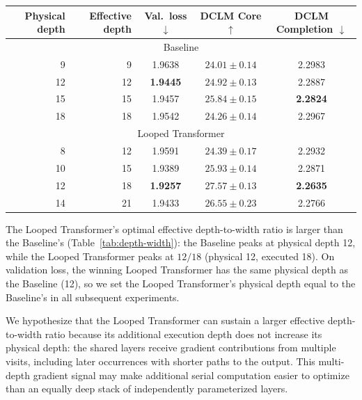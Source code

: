 \documentclass[]{bytedance_seed}
\theoremstyle{definition}
\theoremstyle{remark}
\begin{document}
\begin{center}
\small
{}
\label{tab:depth-width}
\begin{tabular}{rrccc}
\toprule
Physical depth & Effective depth &
Val.\ loss $\downarrow$ & DCLM Core $\uparrow$ & DCLM Completion $\downarrow$ \\
\midrule
\multicolumn{5}{c}{Baseline} \\
9  & 9  & 1.9638 & $24.01 \pm 0.14$ & 2.2983 \\
12 & 12 & \textbf{1.9445} & $24.92 \pm 0.13$ & 2.2887 \\
15 & 15 & 1.9457 & $\mathbf{25.84 \pm 0.15}$ & \textbf{2.2824} \\
18 & 18 & 1.9542 & $24.26 \pm 0.14$ & 2.2967 \\
\midrule
\multicolumn{5}{c}{Looped Transformer} \\
8  & 12 & 1.9591 & $24.39 \pm 0.17$ & 2.2932 \\
10 & 15 & 1.9389 & $25.93 \pm 0.14$ & 2.2871 \\
12 & 18 & \textbf{1.9257} & $\mathbf{27.57 \pm 0.13}$ & \textbf{2.2635} \\
14 & 21 & 1.9433 & $26.55 \pm 0.23$ & 2.2766 \\
\bottomrule
\end{tabular}
\end{center}

The Looped Transformer's optimal effective depth-to-width ratio is larger than the Baseline's (Table~\ref{tab:depth-width}): the Baseline peaks at physical depth 12, while the Looped Transformer peaks at $12/18$ (physical 12, executed 18).
%
On validation loss, the winning Looped Transformer has the same physical depth as the Baseline (12), so we set the Looped Transformer's physical depth equal to the Baseline's in all subsequent experiments.

We hypothesize that the Looped Transformer can sustain a larger effective depth-to-width ratio because its additional execution depth does not increase its physical depth: the shared layers receive gradient contributions from multiple visits, including later occurrences with shorter paths to the output.
This multi-depth gradient signal may make additional serial computation easier to optimize than an equally deep stack of independently parameterized layers.
%
\end{document}
